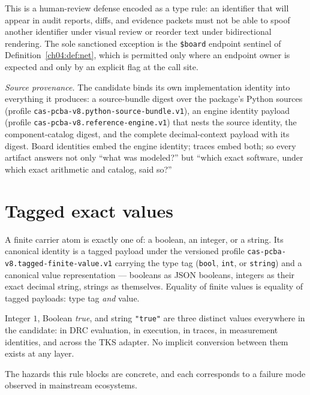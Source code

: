 This is a human-review defense encoded as a type rule: an identifier that
will appear in audit reports, diffs, and evidence packets must not be able
to spoof another identifier under visual review or reorder text under
bidirectional rendering. The sole sanctioned exception is the
\texttt{\$board} endpoint sentinel of Definition~\ref{ch04:def:net}, which
is permitted only where an endpoint owner is expected and only by an
explicit flag at the call site.

\emph{Source provenance.} The candidate binds its own implementation
identity into everything it produces: a source-bundle digest over the
package's Python sources (profile
\texttt{cas-pcba-v8.python-source-bundle.v1}), an engine identity payload
(profile \texttt{cas-pcba-v8.reference-engine.v1}) that nests the source
identity, the component-catalog digest, and the complete decimal-context
payload with its digest. Board identities embed the engine identity;
traces embed both; so every artifact answers not only ``what was
modeled?'' but ``which exact software, under which exact arithmetic and
catalog, said so?''

\section{Tagged exact values}\label{ch04:sec:tagged}

\begin{definition}\label{ch04:def:tagged}
A finite carrier atom is exactly one of: a boolean, an integer, or a
string. Its canonical identity is a tagged payload under the versioned
profile \texttt{cas-pcba-v8.tagged-finite-value.v1} carrying the type tag
(\texttt{bool}, \texttt{int}, or \texttt{string}) and a canonical value
representation --- booleans as JSON booleans, integers as their exact
decimal string, strings as themselves. Equality of finite values is
equality of tagged payloads: type tag \emph{and} value.
\end{definition}

\begin{ruleenv}\label{ch04:rule:typepun}
Integer $1$, Boolean \emph{true}, and string \texttt{"true"} are three
distinct values everywhere in the candidate: in DRC evaluation, in
execution, in traces, in measurement identities, and across the TKS
adapter. No implicit conversion between them exists at any layer.
\end{ruleenv}

The hazards this rule blocks are concrete, and each corresponds to a
failure mode observed in mainstream ecosystems.

